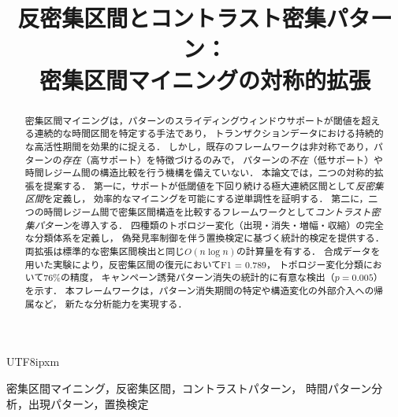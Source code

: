 \documentclass[conference]{IEEEtran}
\begin{document}
\begin{CJK}{UTF8}{ipxm}

\title{反密集区間とコントラスト密集パターン：\\
密集区間マイニングの対称的拡張}

\author{
}

\maketitle

\begin{abstract}
密集区間マイニングは，パターンのスライディングウィンドウサポートが閾値を超える連続的な時間区間を特定する手法であり，
トランザクションデータにおける持続的な高活性期間を効果的に捉える．
しかし，既存のフレームワークは非対称であり，パターンの\emph{存在}（高サポート）を特徴づけるのみで，
パターンの\emph{不在}（低サポート）や時間レジーム間の構造比較を行う機構を備えていない．
本論文では，二つの対称的拡張を提案する．
第一に，サポートが低閾値を下回り続ける極大連続区間として\emph{反密集区間}を定義し，
効率的なマイニングを可能にする逆単調性を証明する．
第二に，二つの時間レジーム間で密集区間構造を比較するフレームワークとして\emph{コントラスト密集パターン}を導入する．
四種類のトポロジー変化（出現・消失・増幅・収縮）の完全な分類体系を定義し，
偽発見率制御を伴う置換検定に基づく統計的検定を提供する．
両拡張は標準的な密集区間検出と同じ$O(n \log n)$の計算量を有する．
合成データを用いた実験により，反密集区間の復元においてF1 = 0.789，
トポロジー変化分類において76\%の精度，
キャンペーン誘発パターン消失の統計的に有意な検出（$p = 0.005$）を示す．
本フレームワークは，パターン消失期間の特定や構造変化の外部介入への帰属など，
新たな分析能力を実現する．
\end{abstract}

\begin{IEEEkeywords}
密集区間マイニング，反密集区間，コントラストパターン，
時間パターン分析，出現パターン，置換検定
\end{IEEEkeywords}











\end{CJK}
\end{document}
